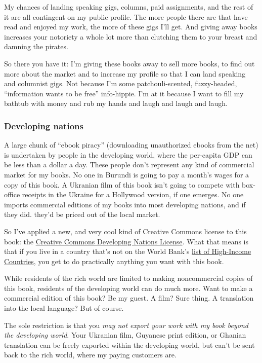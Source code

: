 My chances of landing speaking gigs, columns, paid assignments, and
the rest of it are all contingent on my public profile.  The more
people there are that have read and enjoyed my work, the more of these
gigs I'll get.  And giving away books increases your notoriety a whole
lot more than clutching them to your breast and damning the pirates.

So there you have it:  I'm giving these books away to sell more books,
to find out more about the market and to increase my profile so that I
can land speaking and columnist gigs.  Not because I'm some
patchouli-scented, fuzzy-headed, ``information wants to be free''
info-hippie.  I'm at it because I want to fill my bathtub with money
and rub my hands and laugh and laugh and laugh.


\subsubsection{Developing nations}

A large chunk of ``ebook piracy'' (downloading unauthorized ebooks
from the net) is undertaken by people in the developing world, where
the per-capita GDP can be less than a dollar a day.  These people
don't represent any kind of commercial market for my books.  No one in
Burundi is going to pay a month's wages for a copy of this book.  A
Ukranian film of this book isn't going to compete with box-office
receipts in the Ukraine for a Hollywood version, if one emerges.  No
one imports commercial editions of my books into most developing
nations, and if they did.  they'd be priced out of the local market. 

So I've applied a new, and very cool kind of Creative Commons license
to this book:  the 
\href{http://creativecommons.org/licenses/devnations/2.0/}{Creative
Commons Developing Nations License}.  What that means is that if
you live in a country that's not on the World Bank's
\href{http://rru.worldbank.org/DoingBusiness/ExploreEconomies/EconomyCharacteristics.aspx}{list
of High-Income Countries}, you get to do practically anything you
want with this book.

While residents of the rich world are limited to making noncommercial
copies of this book, residents of the developing world can do much
more.  Want to make a commercial edition of this book?  Be my guest. 
A film?  Sure thing.  A translation into the local language?  But of
course.

The sole restriction is that you \textit{may not export your work with
my book beyond the developing world}.  Your Ukranian film, Guyanese
print edition, or Ghanian translation can be freely exported within
the developing world, but can't be sent back to the rich world, where
my paying customers are. 

